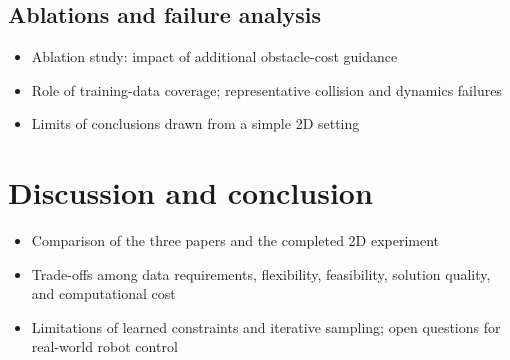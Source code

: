 \documentclass[a4paper]{IEEEtran}
\begin{document}
\subsection{Ablations and failure analysis}
\begin{itemize}
    \item Ablation study: impact of additional obstacle-cost guidance
    \item Role of training-data coverage; representative collision and dynamics failures
    \item Limits of conclusions drawn from a simple 2D setting
\end{itemize}

\section{Discussion and conclusion}
\begin{itemize}
    \item Comparison of the three papers and the completed 2D experiment
    \item Trade-offs among data requirements, flexibility, feasibility, solution quality, and computational cost
    \item Limitations of learned constraints and iterative sampling; open questions for real-world robot control
\end{itemize}



\end{document}
